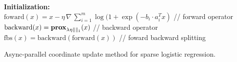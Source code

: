 \begin{algorithm}[H]\label{alg:fbs_l1_log}
  \textbf{Initialization:} \\
  \quad $\text{foward}(x) = x - \eta \, \nabla \,\sum_{i = 1}^m \log (1 + \exp(-b_i \cdot a_i^T x)$ // forward operator \\
  \quad $\text{backward}(x) = \mathbf{prox}_{\lambda \eta \|\|_1} (x)$ \hspace{33mm} // backward operator\\
  \quad $\text{fbs}(x) = \text{backward}(\text{forward}(x))$  \hspace{29mm} // foward backward splitting \\
  \caption{Async-parallel coordinate update method for sparse logistic regression.}
\end{algorithm}

